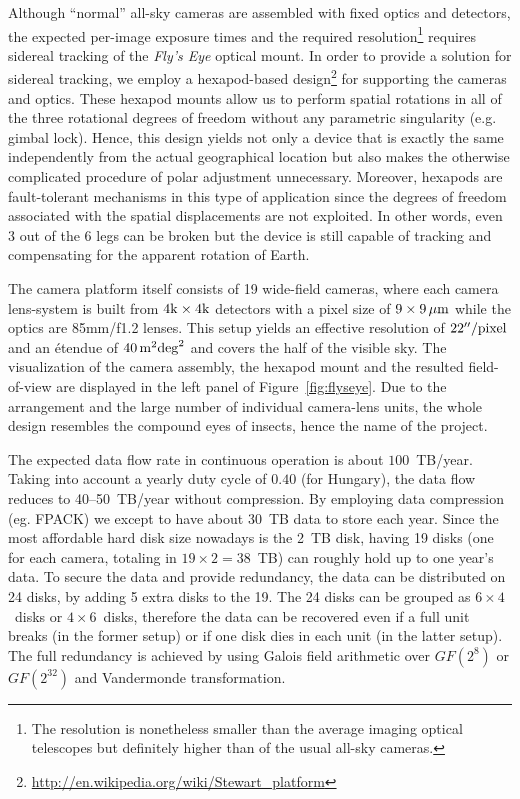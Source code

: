 Although ``normal'' all-sky cameras are assembled with fixed optics and detectors, the expected per-image exposure times and the required resolution\footnote{The resolution is nonetheless smaller than the average imaging optical telescopes but definitely higher than of the usual all-sky cameras.} requires sidereal tracking of the {\it Fly's Eye} optical mount. In order to provide a solution for sidereal tracking, we employ a hexapod-based design\footnote{\url{http://en.wikipedia.org/wiki/Stewart_platform}} for supporting the cameras and optics. These hexapod mounts allow us to perform spatial rotations in all of the three rotational degrees of freedom without any parametric singularity (e.g. gimbal lock). Hence, this design yields not only a device that is exactly the same independently from the actual geographical location but also makes the otherwise complicated procedure of polar adjustment unnecessary. Moreover, hexapods are fault-tolerant mechanisms in this type of application since the degrees of freedom associated with the spatial displacements are not exploited. In other words, even 3 out of the 6 legs can be broken but the device is still capable of tracking and compensating for the apparent rotation of Earth. 

The camera platform itself consists of 19 wide-field cameras, where each camera lens-system is built from $4{\rm k}\times 4{\rm k}$ detectors with a pixel size of $9\times9\,{\rm\mu m}$ while the optics are 85mm/f1.2 lenses. This setup yields an effective resolution of $22''/{\rm pixel}$ and an \'etendue of $40\,{\rm m}^2{\rm deg}^2$ and covers the half of the visible sky. The visualization of the camera assembly, the hexapod mount and the resulted field-of-view are displayed in the left panel of Figure~\ref{fig:flyseye}. Due to the arrangement and the large number of individual camera-lens units, the whole design resembles the compound eyes of insects, hence the name of the project.

The expected data flow rate in continuous operation is about $100$~TB/year. Taking into account a yearly duty cycle of $0.40$ (for Hungary), the data flow reduces to 40--50~TB/year without compression. By employing data compression (eg. FPACK) we except to have about 30~TB data to store each year. Since the most affordable hard disk size nowadays is the 2~TB disk, having 19 disks (one for each camera, totaling in $19\times2=38$~TB) can roughly hold up to one year's data. To secure the data and provide redundancy, the data can be distributed on 24 disks, by adding 5 extra disks to the 19. The 24 disks can be grouped as $6\times4$~disks or $4\times6$~disks, therefore the data can be recovered even if a full unit breaks (in the former setup) or if one disk dies in each unit (in the latter setup). The full redundancy is achieved by using Galois field arithmetic over $GF(2^8)$ or $GF(2^{32})$ and Vandermonde transformation.

